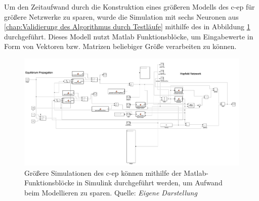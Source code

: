Um den Zeitaufwand durch die Konstruktion eines größeren Modells des \gls{c-ep} für größere Netzwerke zu sparen, wurde die Simulation mit sechs Neuronen aus \ref{chap:Validierung des Algorithmus durch Testläufe} mithilfe des in Abbildung \ref{fig:C-EP Sim Simulink} durchgeführt. Dieses Modell nutzt Matlab Funktionsblöcke, um Eingabewerte in Form von Vektoren bzw. Matrizen beliebiger Größe verarbeiten zu können.

\begin{figure}[h]
  \includegraphics[width=\textwidth]{abbildungen/c-ep_sim_simulink.png}
  \caption{Größere Simulationen des \gls{c-ep} können mithilfe der Matlab-Funktionsblöcke in Simulink durchgeführt werden, um Aufwand beim Modellieren zu sparen. Quelle: \textit{Eigene Darstellung}}
  \label{fig:C-EP Sim Simulink}
\end{figure}
